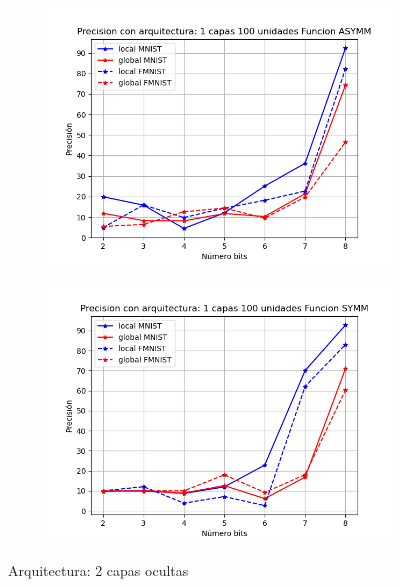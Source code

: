 \begin{figure}[H]
\begin{subfigure}[H]{0.475\textwidth}
    \end{subfigure}
    \begin{subfigure}[H]{0.475\textwidth}
    \includegraphics[width=\textwidth]{imagenes/HSIC/Precision con arquitectura: 1 capas 100 unidades Funcion ASYMM.png}
    \end{subfigure}
    \begin{subfigure}[H]{0.475\textwidth}
    \includegraphics[width=\textwidth]{imagenes/HSIC/Precision con arquitectura: 1 capas 100 unidades Funcion SYMM.png}
    \end{subfigure}
    \caption{Arquitectura: 2 capas ocultas}
\end{figure}

